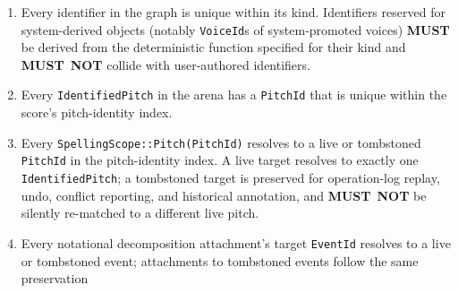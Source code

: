 \documentclass[11pt,letterpaper]{report}
\newcounter{requirement}[chapter]
\newcommand{\MUST}{\textbf{MUST}}
\newcommand{\MUSTNOT}{\textbf{MUST}\nobreak\ \textbf{NOT}}
\begin{document}
\begin{requirement}
\begin{enumerate}
\begin{itemize}
        \item \texttt{TrajectoryEvent.start} --- live pitch.
        \item \texttt{TrajectoryEvent.end} --- live pitch.
        \item \texttt{GraphicEvent.graphics} --- stored graphic object.
        \item \texttt{CueEvent.source} --- live event.
        \item \texttt{TempoSegment.start} --- anchor target.
        \item \texttt{TempoSegment.end} --- anchor target.
        \item \texttt{Score.voice\_homes} --- declared staff, extant voice.
      \end{itemize}
      The surface holds every time anchor invariant~9 reads but a user
      break's: a break whose event a later delete or undo removes stays
      keyed by its anchor and draws nothing (Operation Catalog,
      \texttt{SetUserSystemBreak}), a transient dangling state the
      re-anchoring rules permit. No operation deletes a measure, and an
      undo that would remove one a present break names is held (Operation
      Catalog, \texttt{CreateMeasure}). A meter change's anchor and a spelling
      range's ends are anchor targets beside the time signature a meter change
      names.
    \item Every identifier in the graph is unique within its kind.
      Identifiers reserved for system-derived objects (notably
      \texttt{VoiceId}s of system-promoted voices) \MUST{} be derived
      from the deterministic function specified for their kind and
      \MUSTNOT{} collide with user-authored identifiers.
    \item Every \texttt{IdentifiedPitch} in the arena has a
      \texttt{PitchId} that is unique within the score's
      pitch-identity index.
    \item Every \texttt{SpellingScope::Pitch(PitchId)} resolves to a
      live or tombstoned \texttt{PitchId} in the pitch-identity
      index. A live target resolves to exactly one
      \texttt{IdentifiedPitch}; a tombstoned target is preserved for
      operation-log replay, undo, conflict reporting, and historical
      annotation, and \MUSTNOT{} be silently re-matched to a
      different live pitch.
    \item Every notational decomposition attachment's target
      \texttt{EventId} resolves to a live or tombstoned event;
      attachments to tombstoned events follow the same preservation

\end{enumerate}
\end{requirement}
\end{document}
